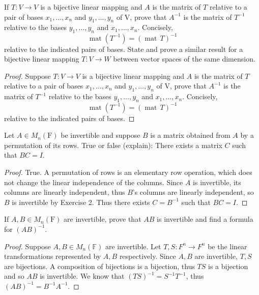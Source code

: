 \begin{tcolorbox}[title=Problem 8, breakable]
If $T:V \to V$ is a bijective linear mapping 
and $A$ is the matrix of $T$ relative to a pair of 
bases $x_1, \ldots, x_n$ and $y_1, \ldots, y_n$ of V, 
prove that $A^{-1}$ is the matrix of $T^{-1}$ relative 
to the bases $y_1, \ldots, y_n$ and $x_1, \ldots, x_n$. Concisely,
\[
    \operatorname{mat}(T^{-1}) = (\operatorname{mat}\, T)^{-1}
\]
relative to the indicated pairs of bases. 
State and prove a similar result for a bijective 
linear mapping $T:V \to W$ between vector spaces of the same dimension.
\end{tcolorbox}

\begin{proof}
    Suppose $T:V \to V$ is a bijective linear mapping 
    and $A$ is the matrix of $T$ relative to a pair of 
    bases $x_1, \ldots, x_n$ and $y_1, \ldots, y_n$ of V, 
    prove that $A^{-1}$ is the matrix of $T^{-1}$ relative 
    to the bases $y_1, \ldots, y_n$ and $x_1, \ldots, x_n$. Concisely,
    \[
        \operatorname{mat}(T^{-1}) = (\operatorname{mat}\, T)^{-1}
    \]
    relative to the indicated pairs of bases.  
\end{proof}

\begin{tcolorbox}[title=Problem 9, breakable]
Let $A \in M_n(\text{F})$ be invertible and suppose $B$ is a matrix obtained from $A$ by a permutation of its rows. True or false (explain): There exists a matrix $C$ such that $BC = I$.
\end{tcolorbox}

\begin{proof}
    True. A permutation of rows is an elementary row operation, which does not change 
    the linear independence of the columns. Since $A$ is invertible, its columns are 
    linearly independent, thus $B$'s columns are linearly independent, so $B$ is 
    invertible by Exercise 2. Thus there exists $C = B^{-1}$ such that $BC = I$.
\end{proof}

\begin{tcolorbox}[title=Problem 10, breakable]
If $A, B \in M_n(\text{F})$ are invertible, prove that $AB$ is invertible and find a formula for $(AB)^{-1}$.
\end{tcolorbox}

\begin{proof}
    Suppose $A, B \in M_n(\mathbb{F})$ are invertible.
    Let $T, S : F^n \to F^n$ be the linear transformations represented by $A, B$ respectively.
    Since $A, B$ are invertible, $T, S$ are bijections.
    A composition of bijections is a bijection, thus $TS$ is a bijection and so $AB$ is invertible.
    We know that $(TS)^{-1} = S^{-1}T^{-1}$, thus 
        $(AB)^{-1} = B^{-1}A^{-1}$.
\end{proof}

